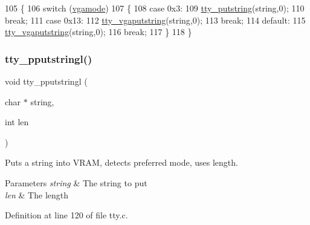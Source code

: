 \begin{DoxyCode}
105                                   \{
106     \textcolor{keywordflow}{switch} (\hyperlink{a00173_af93b0649fdd1bea5b6d29ed37205aa2c_af93b0649fdd1bea5b6d29ed37205aa2c}{vgamode})
107     \{
108     \textcolor{keywordflow}{case} 0x3:
109         \hyperlink{a00173_a5b5bf610a57f3c59b2851fa2652081ec_a5b5bf610a57f3c59b2851fa2652081ec}{tty\_putstring}(\textcolor{keywordtype}{string},0);
110         \textcolor{keywordflow}{break};
111     \textcolor{keywordflow}{case} 0x13:
112         \hyperlink{a00173_a05ca3f5e64f38fec173b635ca8465415_a05ca3f5e64f38fec173b635ca8465415}{tty\_vgaputstring}(\textcolor{keywordtype}{string},0);
113         \textcolor{keywordflow}{break};
114     \textcolor{keywordflow}{default}:
115         \hyperlink{a00173_a05ca3f5e64f38fec173b635ca8465415_a05ca3f5e64f38fec173b635ca8465415}{tty\_vgaputstring}(\textcolor{keywordtype}{string},0);
116         \textcolor{keywordflow}{break};
117     \}
118 \}
\end{DoxyCode}
\mbox{\label{a00176_abaf93f9e56ddb7b10462070f59e534e4_abaf93f9e56ddb7b10462070f59e534e4}} 
\subsubsection{\texorpdfstring{tty\+\_\+pputstringl()}{tty\_pputstringl()}}
{\footnotesize\ttfamily void tty\+\_\+pputstringl (\begin{DoxyParamCaption}\item[{char $\ast$}]{string,  }\item[{int}]{len }\end{DoxyParamCaption})}



Puts a string into V\+R\+AM, detects preferred mode, uses length. 


\begin{DoxyParams}{Parameters}
{\em string} & The string to put \\
\hline
{\em len} & The length \\
\hline
\end{DoxyParams}


Definition at line 120 of file tty.\+c.


